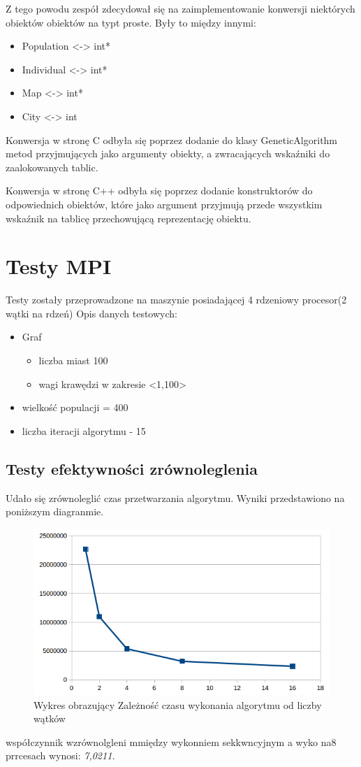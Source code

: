 \documentclass[10pt,a4paper]{article}
\begin{document}
Z tego powodu zespół zdecydował się na zaimplementowanie konwersji niektórych obiektów obiektów na typt proste. Były to między innymi:
\begin{itemize}
\item Population <-> int*
\item Individual <-> int*
\item Map <-> int*
\item City <-> int
\end{itemize} 

Konwersja w stronę C odbyła się poprzez dodanie do klasy GeneticAlgorithm metod przyjmujących jako argumenty obiekty, a zwracających wskaźniki do zaalokowanych tablic.

Konwersja w stronę C++ odbyła się poprzez dodanie konstruktorów do odpowiednich obiektów, które jako argument przyjmują przede wszystkim wskaźnik na tablicę przechowującą reprezentację obiektu.

\section{Testy MPI}
Testy zostały przeprowadzone na maszynie posiadającej 4 rdzeniowy procesor(2 wątki na rdzeń)
Opis danych testowych:
\begin{itemize}\label{opisGrafu}
\item Graf
\begin{itemize}
\item liczba miast 100 
\item wagi krawędzi w zakresie <1,100>
\end{itemize} 
\item wielkość populacji = 400
\item liczba iteracji algorytmu - 15
\end{itemize} 
\subsection{Testy efektywności zrównoleglenia}
Udało się zrównoleglić czas  przetwarzania algorytmu. Wyniki przedstawiono na poniższym diagranmie.

\begin{figure}[H]
\includegraphics[scale=0.5]{mpi_wykr.png}
\centering
\caption{\label{wykr:Mpi}Wykres obrazujący Zależność czasu wykonania algorytmu od liczby wątków}
\end{figure}
współczynnik wzrównolgleni mmiędzy wykonniem sekkwncyjnym  a wyko na8 prrcesach wynosi:\textit{ 7,0211.}
\pagebreak
\end{document}

